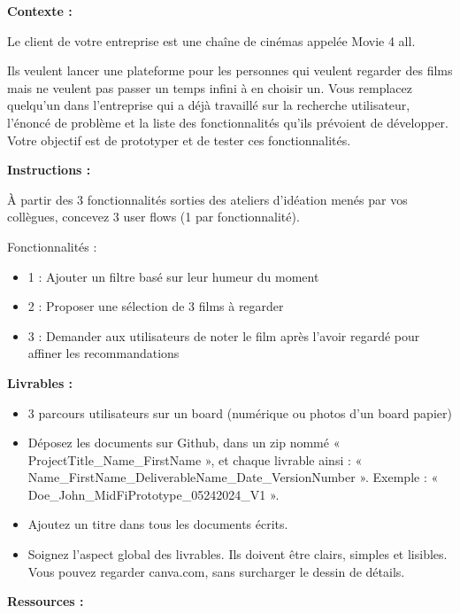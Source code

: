 \makeheaderfiles

\textbf{Contexte :}

Le client de votre entreprise est une chaîne de cinémas appelée Movie 4 all.

Ils veulent lancer une plateforme pour les personnes qui veulent regarder des films mais ne veulent pas passer un temps infini à en choisir un.
Vous remplacez quelqu'un dans l'entreprise qui a déjà travaillé sur la recherche utilisateur, l'énoncé de problème et la liste des fonctionnalités qu'ils prévoient de développer. Votre objectif est de prototyper et de tester ces fonctionnalités.

\textbf{Instructions :}

À partir des 3 fonctionnalités sorties des ateliers d'idéation menés par vos collègues, concevez 3 user flows (1 par fonctionnalité).

Fonctionnalités :

\begin{itemize}
\item 1 : Ajouter un filtre basé sur leur humeur du moment
\item 2 : Proposer une sélection de 3 films à regarder
\item 3 : Demander aux utilisateurs de noter le film après l'avoir regardé pour affiner les recommandations
\end{itemize}

\textbf{Livrables :}

\begin{itemize}
\item 3 parcours utilisateurs sur un board (numérique ou photos d'un board papier)
\item Déposez les documents sur Github, dans un zip nommé « ProjectTitle\_Name\_FirstName », et chaque livrable ainsi : « Name\_FirstName\_DeliverableName\_Date\_VersionNumber ». Exemple : « Doe\_John\_MidFiPrototype\_05242024\_V1 ».
\item Ajoutez un titre dans tous les documents écrits.
\item Soignez l'aspect global des livrables. Ils doivent être clairs, simples et lisibles. Vous pouvez regarder canva.com, sans surcharger le dessin de détails.
\end{itemize}

\textbf{Ressources :}

